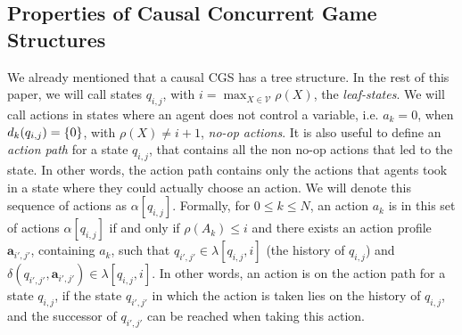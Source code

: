 \subsection{Properties of Causal Concurrent Game Structures}
We already mentioned that a causal CGS has a tree structure. In the rest of this paper, we will call states $q_{i,j}$, with $i = \max_{X\in \mathcal{V}} \rho(X)$, the \emph{leaf-states}. 
We will call actions in states where an agent does not control a variable, i.e. $a_k = 0$, when $d_k(q_{i,j}) = \{ {0} \}$, with $\rho(X) \neq i + 1$, \emph{no-op actions}. It is also useful to define an \emph{action path} for a state $q_{i,j}$, that contains all the non no-op actions that led to the state. In other words, the action path contains only the actions that agents took in a state where they could actually choose an action. We will denote this sequence of actions as $\alpha[q_{i,j}]$. 
Formally, for $0 \leq k \leq N$, an action $a_k$ is in this set of actions  $\alpha[q_{i,j}]$ if and only if $\rho(A_k)\leq i$ and there exists an action profile $\mathbf{a}_{i',j'}$, containing $a_k$, such that $q_{i',j'} \in \lambda[q_{i,j} , i]$  (the history of $q_{i,j}$) and $\delta(q_{i',j'} , \mathbf{a}_{i',j'}) \in \lambda[q_{i,j} , i]$. In other words, an action is on the action path for a state $q_{i,j}$, if the state $q_{i',j'}$ in which the action is taken lies on the history of $q_{i,j}$, and the successor of $q_{i',j'}$ can be reached when taking this action.

